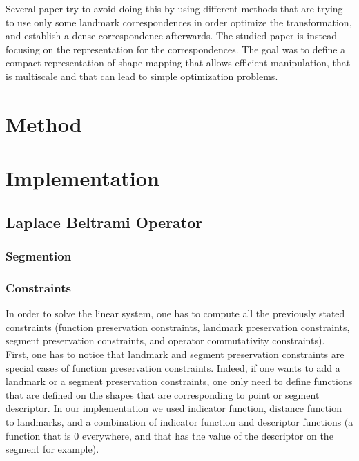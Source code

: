 \documentclass[10pt,twocolumn,letterpaper]{article}
\begin{document}
Several paper try to avoid doing this by using different methods that are trying to use only some landmark correspondences in order optimize the transformation, and establish a dense correspondence afterwards. The studied paper is instead focusing on the representation for the correspondences. The goal was to define a compact representation of shape mapping that allows efficient manipulation, that is multiscale and that can lead to simple optimization problems.


\section{Method} %

\section{Implementation}
\subsection{Laplace Beltrami Operator}
\subsubsection*{Segmention} %
\subsubsection*{Constraints} %
In order to solve the linear system, one has to compute all the previously stated constraints (function preservation constraints, landmark preservation constraints, segment preservation constraints, and operator commutativity constraints). \\

First, one has to notice that landmark and segment preservation constraints are special cases of function preservation constraints. Indeed, if one wants to add a landmark or a segment preservation constraints, one only need to define functions that are defined on the shapes that are corresponding to point or segment descriptor. In our implementation we used indicator function, distance function to landmarks, and a combination of indicator function and descriptor functions (a function that is $0$ everywhere, and that has the value of the descriptor on the segment for example). \\
\end{document}
